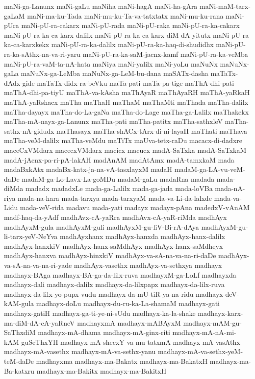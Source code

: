 {maNi-ga-Lanunx
maNi-gaLu
maNiha
maNi-hagA
maNi-ha-gAra
maNi-maM-tarx-gaLaM
maNi-ma-ku-Tada
maNi-mu-ku-Ta-va-tatxtatx
maNi-mu-ku-rana
maNi-pUra
maNi-pU-ra-cakarx
maNi-pU-rada
maNi-pU-raka
maNi-pU-ra-ka-cakarx
maNi-pU-ra-ka-ca-karx-dalilx
maNi-pU-ra-ka-ca-karx-diM-dA-yitutx
maNi-pU-ra-ka-ca-karxkekx
maNi-pU-ra-ka-dalilx
maNi-pU-ra-ka-haq-di-shudidhx
maNi-pU-ra-ka-sAthx-na-va-ri-yaru
maNi-pU-ra-ka-saM-jacnx-kamf
maNi-pU-ra-ka-veMba
maNi-pU-ra-vaM-ta-nA-hata
maNiya
maNi-yalilx
maNi-yoLu
maNuNx
maNuNx-gaLa
maNuNx-ga-LeMba
maNuNx-ga-LeM-bu-dana
maSATx-dasha
maTaTx-dAdx-gide
maTaTx-didx-ra-beVku
maTa-pati
maTa-pa-tige
maThA-dhi-pati
maThA-dhi-pa-tiyU
maThA-va-kAsha
maThAyaR
maThAyaRH
maThA-yaRkaH
maThA-yaRshacx
maTha
maThaH
maThaM
maThaMti
maThada
maTha-dalilx
maTha-dayayx
maTha-do-La-gaNa
maTha-do-Lage
maTha-ga-Lalilx
maThakekx
maTha-mA-nayx-ga-Lanunx
maTha-pati
maTha-patitx
maTha-sathxleV
maTha-sathx-nA-gidudx
maThasayx
maTha-shACx-tArx-di-ni-layaH
maThati
maThava
maTha-veM-dalilx
maTha-veMdu
maTiTx
maUva-tetx-raDu
macacx-di-dadxre
maceCxVMdarx
macecxVMdarx
macicx
macucx
madA-SaTxka
madA-SaTxkaM
madA-jAcnx-pa-ri-pA-lakAH
madAnAM
madAtAmx
madA-tamxkaM
mada
madaBxkAtx
madaBx-katx-ja-na-vA-tasxlayxM
madaH
madaM-ga-LA-vu-veM-daDe
madaM-ga-Lo-Lavx-La-goMDu
madaM-gaLu
madaRna
madada
mada-diMda
madadx
madadxLe
mada-ga-Lalilx
mada-ga-jada
mada-loVBa
mada-nA-riya
mada-na-hara
mada-tarxya
mada-tarxyaM
mada-va-Li-da-lalxde
mada-va-Lidu
mada-veV-rida
madavu
mada-yati
madayx
madayx-pAna
madedxV-vAnAM
madf-haq-da-yAdf
madhAvx-cA-yaRra
madhAvx-cA-yaR-riMda
madhAyx
madhAyxM-gula
madhAyxM-guli
madhAyxM-gu-liV-Bi-rA-dAya
madhAyxM-gu-li-tarx-yeV-NeYva
madhAyxhanx
madhAyx-hanxda
madhAyx-hanx-dalilx
madhAyx-hanxkiV
madhAyx-hanx-saMdhAyx
madhAyx-hanx-saMdheyx
madhAyx-hanxva
madhAyx-hinxkiV
madhAyx-va-sA-na-va-na-ri-daDe
madhAyx-va-sA-na-va-na-ri-yade
madhAyx-vasethx
madhAyx-va-sethxya
madhayx
madhayx-BAga
madhayx-BA-ga-da-lilx-ruva
madhayxM-ga-LoLf
madhayxda
madhayx-dali
madhayx-dalilx
madhayx-da-lilxpapx
madhayx-da-lilx-ruva
madhayx-da-lilx-yo-pupx-vudu
madhayx-da-mU-tiR-ya-na-ridu
madhayx-deV-kAM-gula
madhayx-doLu
madhayx-du-ru-ka-La-shamaM
madhayx-gati
madhayx-gatiH
madhayx-ga-ti-ye-ni-sUdu
madhayx-ka-la-shake
madhayx-karx-ma-diM-dA-cA-yaRneV
madhayxmA
madhayx-mABAyxM
madhayx-mAM-gu-SaThxdiM
madhayx-mA-dhama
madhayx-mA-ginx-riti
madhayx-mA-nA-mi-kAM-guSeThxYH
madhayx-mA-shecxY-va-mu-tatxmA
madhayx-mA-vasAthx
madhayx-mA-vasethx
madhayx-mA-va-sethx-yanu
madhayx-mA-va-sethx-yeM-teM-daDe
madhayxma
madhayx-ma-Bakatx
madhayx-ma-BakatxH
madhayx-ma-Ba-katxru
madhayx-ma-Bakitx
madhayx-ma-BakitxH
}
